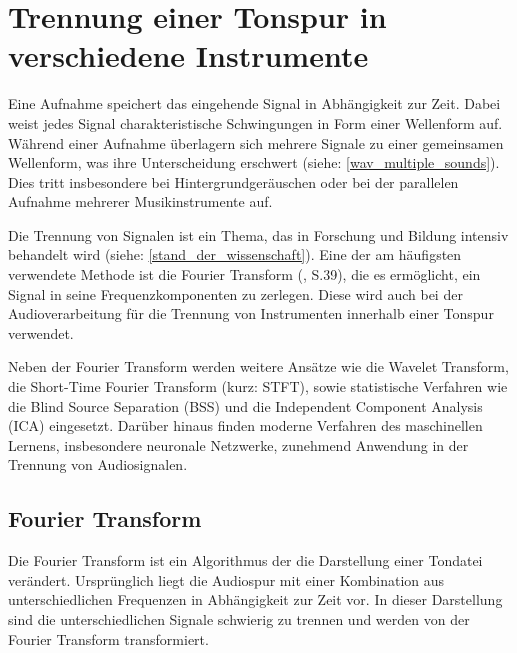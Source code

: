 \parencite{audioformate_im_überblick}

%
\section{Trennung einer Tonspur in verschiedene Instrumente}
%

Eine Aufnahme speichert das eingehende Signal in Abhängigkeit zur Zeit. Dabei weist jedes Signal charakteristische Schwingungen in Form einer Wellenform auf. Während einer Aufnahme überlagern sich mehrere Signale zu einer gemeinsamen Wellenform, was ihre Unterscheidung erschwert (siehe: \cref{wav_multiple_sounds}). Dies tritt insbesondere bei Hintergrundgeräuschen oder bei der parallelen Aufnahme mehrerer Musikinstrumente auf.

\par

Die Trennung von Signalen ist ein Thema, das in Forschung und Bildung intensiv behandelt wird (siehe: \cref{stand_der_wissenschaft}). Eine der am häufigsten verwendete Methode ist die Fourier Transform (\cite{fundamentals_of_music_processing}, S.39), die es ermöglicht, ein Signal in seine Frequenzkomponenten zu zerlegen. Diese wird auch bei der Audioverarbeitung für die Trennung von Instrumenten innerhalb einer Tonspur verwendet.

\par

Neben der Fourier Transform werden weitere Ansätze wie die Wavelet Transform, die Short-Time Fourier Transform (kurz: STFT), sowie statistische Verfahren wie die Blind Source Separation (BSS) und die Independent Component Analysis (ICA) eingesetzt. Darüber hinaus finden moderne Verfahren des maschinellen Lernens, insbesondere neuronale Netzwerke, zunehmend Anwendung in der Trennung von Audiosignalen.

%
\subsection{Fourier Transform}
%

Die Fourier Transform ist ein Algorithmus der die Darstellung einer Tondatei verändert. Ursprünglich liegt die Audiospur mit einer Kombination aus unterschiedlichen Frequenzen in Abhängigkeit zur Zeit vor. In dieser Darstellung sind die unterschiedlichen Signale schwierig zu trennen und werden von der Fourier Transform transformiert.

\par

